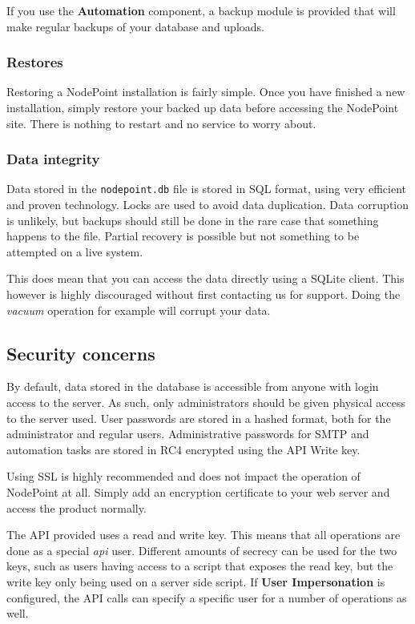 \documentclass[11pt]{article}
\begin{document}
If you use the \textbf{Automation} component, a backup module is provided that will make regular backups of your database and uploads.

\subsubsection{Restores}
Restoring a NodePoint installation is fairly simple. Once you have finished a new installation, simply restore your backed up data before accessing the NodePoint site. There is nothing to restart and no service to worry about.

\subsubsection{Data integrity}
Data stored in the \texttt{nodepoint.db} file is stored in SQL format, using very efficient and proven technology. Locks are used to avoid data duplication. Data corruption is unlikely, but backups should still be done in the rare case that something happens to the file. Partial recovery is possible but not something to be attempted on a live system.

This does mean that you can access the data directly using a SQLite client. This however is highly discouraged without first contacting us for support. Doing the \textit{vacuum} operation for example will corrupt your data.

\subsection{Security concerns}
By default, data stored in the database is accessible from anyone with login access to the server. As such, only administrators should be given physical access to the server used. User passwords are stored in a hashed format, both for the administrator and regular users. Administrative passwords for SMTP and automation tasks are stored in RC4 encrypted using the API Write key.

Using SSL is highly recommended and does not impact the operation of NodePoint at all. Simply add an encryption certificate to your web server and access the product normally.

The API provided uses a read and write key. This means that all operations are done as a special \textit{api} user. Different amounts of secrecy can be used for the two keys, such as users having access to a script that exposes the read key, but the write key only being used on a server side script. If \textbf{User Impersonation} is configured, the API calls can specify a specific user for a number of operations as well.
\end{document}
